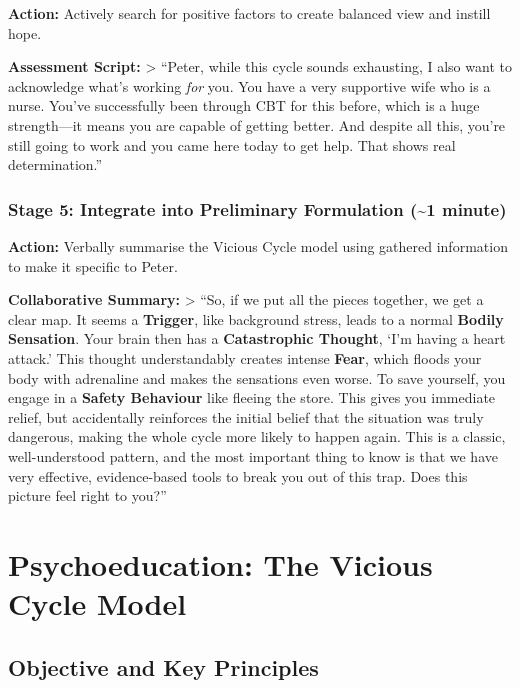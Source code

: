 \documentclass[
  american,
  11pt,
  11pt,
  letterpaper,
  onecolumn]{article}
\begin{document}
\textbf{Action:} Actively search for positive factors to create balanced
view and instill hope.

\textbf{Assessment Script:} \textgreater{} ``Peter, while this cycle
sounds exhausting, I also want to acknowledge what's working \emph{for}
you. You have a very supportive wife who is a nurse. You've successfully
been through CBT for this before, which is a huge strength---it means
you are capable of getting better. And despite all this, you're still
going to work and you came here today to get help. That shows real
determination.''

\subsubsection{Stage 5: Integrate into Preliminary Formulation
(\textasciitilde1
minute)}\label{stage-5-integrate-into-preliminary-formulation-1-minute}

\textbf{Action:} Verbally summarise the Vicious Cycle model using
gathered information to make it specific to Peter.

\textbf{Collaborative Summary:} \textgreater{} ``So, if we put all the
pieces together, we get a clear map. It seems a \textbf{Trigger}, like
background stress, leads to a normal \textbf{Bodily Sensation}. Your
brain then has a \textbf{Catastrophic Thought}, `I'm having a heart
attack.' This thought understandably creates intense \textbf{Fear},
which floods your body with adrenaline and makes the sensations even
worse. To save yourself, you engage in a \textbf{Safety Behaviour} like
fleeing the store. This gives you immediate relief, but accidentally
reinforces the initial belief that the situation was truly dangerous,
making the whole cycle more likely to happen again. This is a classic,
well-understood pattern, and the most important thing to know is that we
have very effective, evidence-based tools to break you out of this trap.
Does this picture feel right to you?''

\section{Psychoeducation: The Vicious Cycle
Model}\label{psychoeducation-the-vicious-cycle-model}

\subsection{Objective and Key
Principles}\label{objective-and-key-principles}
\end{document}
